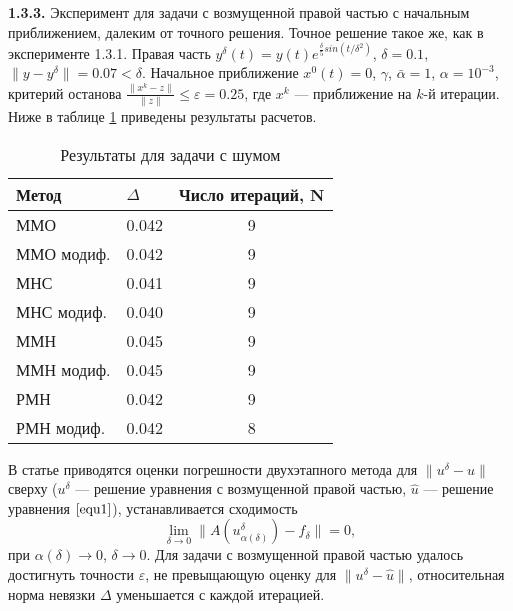 {\bfseries 1.3.3.} Эксперимент для задачи с возмущенной правой частью с начальным приближением, далеким от точного решения.
Точное решение такое же, как в эксперименте 1.3.1. Правая часть $y^\delta(t)=y(t)e^{\frac{\delta}{5} sin(t/{\delta}^2)}$, $\delta=0.1$, $\|y-y^{\delta}\|=0.07<\delta$. Начальное приближение $x^0(t)=0$, $\gamma$, $\bar\alpha=1$, $\alpha=10^{-3}$, критерий останова $\frac{\|x^k-z\|}{\|z\|}\le\varepsilon=0.25$, где $x^k$ --- приближение на $k$-й итерации. Ниже в таблице \ref{table1.3} приведены результаты расчетов.
\begin{table}[]
	\centering
	\renewcommand{\arraystretch}{1.5}
	\caption{Результаты для задачи с шумом}
	\label{table1.3}
	\begin{tabular}{|l|c|c|}
		\hline
		\textbf{Метод}                   & \multicolumn{1}{l|}{\textbf{$\Delta$}} & \multicolumn{1}{l|}{\textbf{Число итераций, N}} \\ \hline
		ММО                              & 0.042                                  & 9                                               \\ \hline
		\multicolumn{1}{|r|}{ММО модиф.} & 0.042                                  & 9                                               \\ \hline
		МНС                              & 0.041                                  & 9                                               \\ \hline
		МНС модиф.                       & 0.040                                  & 9                                               \\ \hline
		ММН                              & 0.045                                  & 9                                               \\ \hline
		ММН модиф.                       & 0.045                                  & 9                                               \\ \hline
		РМН                              & 0.042                                  & 9                                               \\ \hline
		РМН модиф.                       & 0.042                                  & 8                                               \\ \hline
	\end{tabular}
\end{table}

В статье \cite{VasSkur2017} приводятся оценки погрешности двухэтапного метода для $\|u^{\delta}-\hat{u}\|$ сверху ($u^{\delta}$ --- решение уравнения с возмущенной правой частью, $\hat{u}$ --- решение уравнения $\eqref{equ1}$), устанавливается сходимость $$\lim_{\delta\to 0}\|A(u_{\alpha(\delta)}^{\delta})-f_\delta\|=0,$$ при $\alpha(\delta)\to 0$, $\delta\to 0$. Для задачи с возмущенной правой частью удалось достигнуть точности $\varepsilon$, не превыщающую оценку для $\|u^{\delta}-\hat{u}\|$, относительная норма невязки $\Delta$ уменьшается с каждой итерацией.

